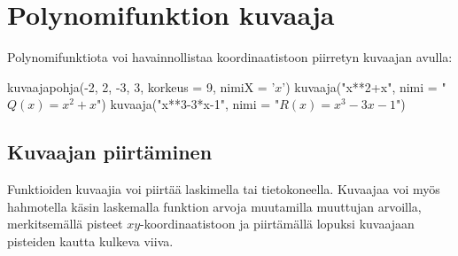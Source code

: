 \section{Polynomifunktion kuvaaja}
Polynomifunktiota voi
havainnollistaa koordinaatistoon piirretyn kuvaajan avulla:



\begin{kuva}
kuvaajapohja(-2, 2, -3, 3, korkeus = 9, nimiX = '$x$')
kuvaaja("x**2+x", nimi = "$Q(x) = x^2+x$")
kuvaaja("x**3-3*x-1", nimi = "$R(x) = x^3-3x-1$")
\end{kuva}

\subsection*{Kuvaajan piirtäminen}


Funktioiden kuvaajia voi piirtää laskimella tai tietokoneella. Kuvaajaa voi myös hahmotella käsin laskemalla funktion arvoja muutamilla muuttujan arvoilla, merkitsemällä pisteet
$xy$-koordinaatistoon ja piirtämällä lopuksi kuvaajaan pisteiden kautta kulkeva viiva.

